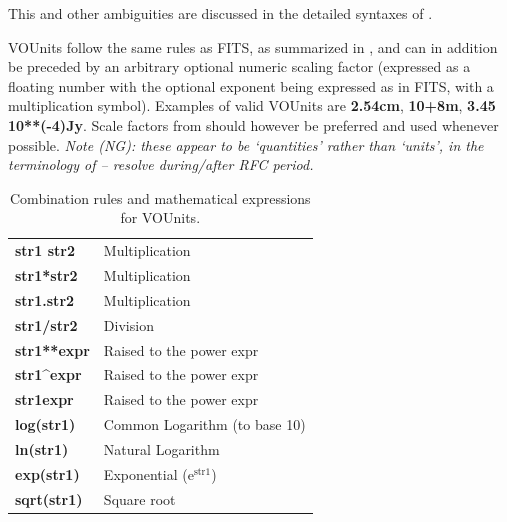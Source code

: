 \documentclass[12pt,notitlepage,onecolumn]{ivoa}
\newcommand{\unit}[1]{\textbf{\textsf{\color{orange}#1}}}
\begin{document}
This and other ambiguities are discussed in the detailed syntaxes of .

VOUnits follow the same rules as FITS, as summarized in , and can in
addition be preceded by an arbitrary optional numeric scaling factor (expressed as a floating number with the optional
exponent being expressed as in FITS, with a multiplication symbol).
Examples of valid VOUnits are \unit{2.54cm}, \unit{10+8m}, \unit{3.45 10**(-4)Jy}. 
Scale factors from  should however be
preferred and used whenever possible.
\emph{Note (NG): these appear to be `quantities' rather than `units',
  in the terminology of  -- resolve
  during/after RFC period.}

\begin{table}
\begin{tabular}[bht]{|l|l|}
\unit{str1 str2} & Multiplication \\
\unit{str1*str2} & Multiplication \\
\unit{str1.str2} & Multiplication \\
\unit{str1/str2} & Division \\
\unit{str1**expr} & Raised to the power expr \\
\unit{str1\^{}expr} & Raised to the power expr \\
\unit{str1expr} & Raised to the power expr \\
\unit{log(str1)} & Common Logarithm (to base 10) \\
\unit{ln(str1)} & Natural Logarithm \\
\unit{exp(str1)} & Exponential (e$^\mathrm{str1}$) \\
\unit{sqrt(str1)} & Square root \\
\end{tabular}
 \caption{Combination rules and mathematical expressions for VOUnits.}
  \label{tab:VOUnitCombine}
\end{table}
\end{document}
